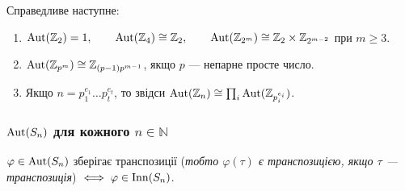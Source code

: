 \documentclass{math_library}
\begin{document}
\begin{theorem}
Справедливе наступне:
\begin{enumerate}[nosep,label={\arabic*)}]
\item $\operatorname{Aut}(\mathbb{Z}_2) = 1, \qquad \operatorname{Aut}(\mathbb{Z}_4) \cong \mathbb{Z}_2, \qquad \operatorname{Aut}(\mathbb{Z}_{2^m}) \cong \mathbb{Z}_2 \times \mathbb{Z}_{2^{m-2}}$ при $m \geq 3$.
\item $\operatorname{Aut}(\mathbb{Z}_{p^m}) \cong \mathbb{Z}_{(p-1)p^{m-1}}$, якщо $p$ --- непарне просте число.
\item Якщо $n = p_1^{e_1} \dots p_t^{e_t}$, то звідси $\operatorname{Aut}(\mathbb{Z}_n) \cong \prod_i \operatorname{Aut}(\mathbb{Z}_{p_i^{e_i}})$.
\end{enumerate}
\end{theorem}

\subsubsection{$\operatorname{Aut}(S_n)$ для кожного $n \in \mathbb{N}$}
\begin{lemma}
$\varphi \in \operatorname{Aut}(S_n)$ зберігає транспозиції (\textit{тобто $\varphi(\tau)$ є транспозицією, якщо $\tau$ --- транспозиція}) $\iff \varphi \in \operatorname{Inn}(S_n)$.
\end{lemma}
\end{document}
